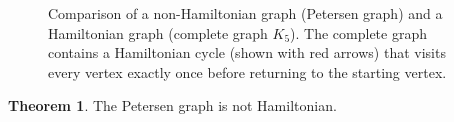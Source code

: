 \documentclass{article}
\theoremstyle{definition}
\newtheorem{theorem}{Theorem}
\begin{document}
\begin{figure}[H]
\caption{Comparison of a non-Hamiltonian graph (Petersen graph) and a Hamiltonian graph (complete graph $K_5$). The complete graph contains a Hamiltonian cycle (shown with red arrows) that visits every vertex exactly once before returning to the starting vertex.}
\label{fig:petersen-vs-k5}
\end{figure}

\begin{theorem}
The Petersen graph is not Hamiltonian.
\end{theorem}
\end{document}
